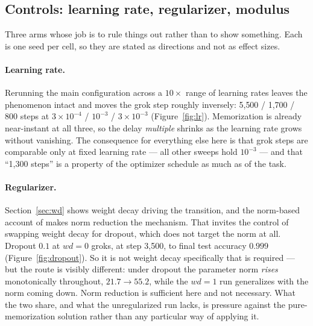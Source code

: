 \documentclass[11pt]{article}
\begin{document}
\subsection{Controls: learning rate, regularizer, modulus}
\label{sec:controls-arms}

Three arms whose job is to rule things out rather than to show something. Each
is one seed per cell, so they are stated as directions and not as effect sizes.

\paragraph{Learning rate.} Rerunning the main configuration across a
$10\times$ range of learning rates leaves the phenomenon intact and moves the
grok step roughly inversely: 5{,}500 / 1{,}700 / 800 steps at
$3\times10^{-4}$ / $10^{-3}$ / $3\times10^{-3}$ (Figure~\ref{fig:lr}).
Memorization is already near-instant at all three, so the delay
\emph{multiple} shrinks as the learning rate grows without vanishing. The
consequence for everything else here is that grok steps are comparable only at
fixed learning rate --- all other sweeps hold $10^{-3}$ --- and that
``1{,}300 steps'' is a property of the optimizer schedule as much as of the
task.

\paragraph{Regularizer.} Section~\ref{sec:wd} shows weight decay driving the
transition, and the norm-based account of \citet{liu2023omnigrok} makes norm
reduction the mechanism. That invites the control of swapping weight decay for
dropout, which does not target the norm at all. Dropout $0.1$ at $wd = 0$
groks, at step 3{,}500, to final test accuracy $0.999$
(Figure~\ref{fig:dropout}). So it is not weight decay specifically that is
required --- but the route is visibly different: under dropout the parameter
norm \emph{rises} monotonically throughout, $21.7 \to 55.2$, while the $wd = 1$
run generalizes with the norm coming down. Norm reduction is sufficient here
and not necessary. What the two share, and what the unregularized run lacks, is
pressure against the pure-memorization solution rather than any particular way
of applying it.
\end{document}
